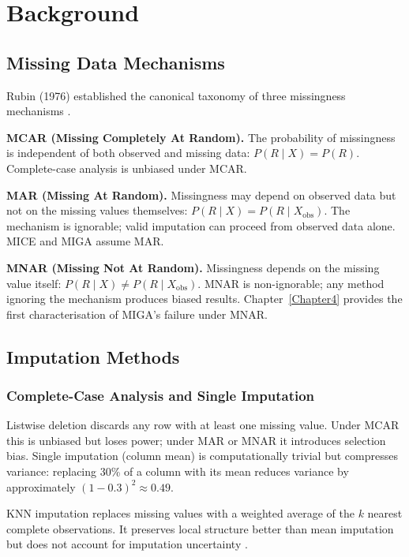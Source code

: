 
\chapter{Background}
\label{Chapter2}

\section{Missing Data Mechanisms}

Rubin (1976) established the canonical taxonomy of three missingness mechanisms \cite{Rubin1976}.

\textbf{MCAR (Missing Completely At Random).} The probability of missingness is independent of both observed and missing data: $P(R \mid X) = P(R)$. Complete-case analysis is unbiased under MCAR.

\textbf{MAR (Missing At Random).} Missingness may depend on observed data but not on the missing values themselves: $P(R \mid X) = P(R \mid X_{\text{obs}})$. The mechanism is ignorable; valid imputation can proceed from observed data alone. MICE and MIGA assume MAR.

\textbf{MNAR (Missing Not At Random).} Missingness depends on the missing value itself: $P(R \mid X) \neq P(R \mid X_{\text{obs}})$. MNAR is non-ignorable; any method ignoring the mechanism produces biased results. Chapter~\ref{Chapter4} provides the first characterisation of MIGA's failure under MNAR.

\section{Imputation Methods}

\subsection{Complete-Case Analysis and Single Imputation}

Listwise deletion discards any row with at least one missing value. Under MCAR this is unbiased but loses power; under MAR or MNAR it introduces selection bias. Single imputation (column mean) is computationally trivial but compresses variance: replacing 30\% of a column with its mean reduces variance by approximately $(1-0.3)^2 \approx 0.49$.

KNN imputation \cite{Troyanskaya2001} replaces missing values with a weighted average of the $k$ nearest complete observations. It preserves local structure better than mean imputation but does not account for imputation uncertainty \cite{Rubin1987}.

